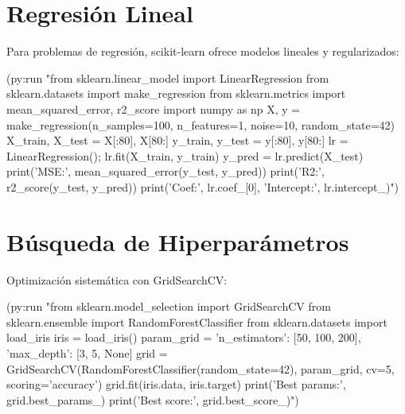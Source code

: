 \begin{center}
\end{center}

\section{Regresión Lineal}

Para problemas de regresión, scikit-learn ofrece modelos lineales y
regularizados:

\begin{lispcode}
(py:run "from sklearn.linear_model import LinearRegression
from sklearn.datasets import make_regression
from sklearn.metrics import mean_squared_error, r2_score
import numpy as np
X, y = make_regression(n_samples=100, n_features=1, noise=10,
                       random_state=42)
X_train, X_test = X[:80], X[80:]
y_train, y_test = y[:80], y[80:]
lr = LinearRegression(); lr.fit(X_train, y_train)
y_pred = lr.predict(X_test)
print('MSE:', mean_squared_error(y_test, y_pred))
print('R2:', r2_score(y_test, y_pred))
print('Coef:', lr.coef_[0], 'Intercept:', lr.intercept_)")
\end{lispcode}

\section{Búsqueda de Hiperparámetros}

Optimización sistemática con GridSearchCV:

\begin{lispcode}
(py:run "from sklearn.model_selection import GridSearchCV
from sklearn.ensemble import RandomForestClassifier
from sklearn.datasets import load_iris
iris = load_iris()
param_grid = {'n_estimators': [50, 100, 200],
              'max_depth': [3, 5, None]}
grid = GridSearchCV(RandomForestClassifier(random_state=42),
                    param_grid, cv=5, scoring='accuracy')
grid.fit(iris.data, iris.target)
print('Best params:', grid.best_params_)
print('Best score:', grid.best_score_)")
\end{lispcode}


